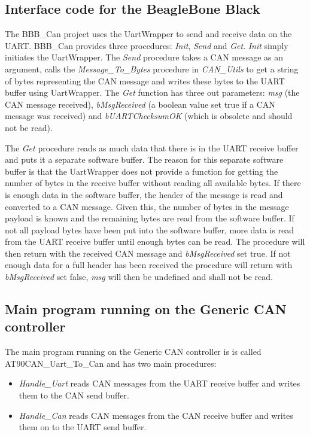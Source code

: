 \subsection{Interface code for the BeagleBone Black}
The BBB\_Can project uses the UartWrapper to send and receive data on the UART. BBB\_Can provides three procedures: \emph{Init}, \emph{Send} and \emph{Get}. \newline
\emph{Init} simply initiates the UartWrapper. \newline
The \emph{Send} procedure takes a CAN message as an argument, calls the \emph{Message\_To\_Bytes} procedure in \emph{CAN\_Utils} to get a string of bytes representing the CAN message and writes these bytes to the UART buffer using UartWrapper. \newline
The \emph{Get} function has three out parameters: \emph{msg} (the CAN message received), \emph{bMsgReceived} (a boolean value set true if a CAN message was received) and \emph{bUARTChecksumOK} (which is obsolete and should not be read). 

The \emph{Get} procedure reads as much data that there is in the UART receive buffer and puts it a separate software buffer. The reason for this separate software buffer is that the UartWrapper does not provide a function for getting the number of bytes in the receive buffer without reading all available bytes. \newline
If there is enough data in the software buffer, the header of the message is read and converted to a CAN message. Given this, the number of bytes in the message payload is known and the remaining bytes are read from the software buffer. If not all payload bytes have been put into the software buffer, more data is read from the UART receive buffer until enough bytes can be read. The procedure will then return with the received CAN message and \emph{bMsgReceived} set true. \newline
If not enough data for a full header has been received the procedure will return with \emph{bMsgReceived} set false, \emph{msg} will then be undefined and shall not be read.


\subsection{Main program running on the Generic CAN controller}
The main program running on the Generic CAN controller is is called AT90CAN\_Uart\_To\_Can and has two main procedures:

\begin{itemize}
   \item { \em Handle\_Uart}
   reads CAN messages from the UART receive buffer and writes them to the CAN send buffer.
   \item { \em Handle\_Can}
   reads CAN messages from the CAN receive buffer and writes them on to the UART send buffer.
\end{itemize}

